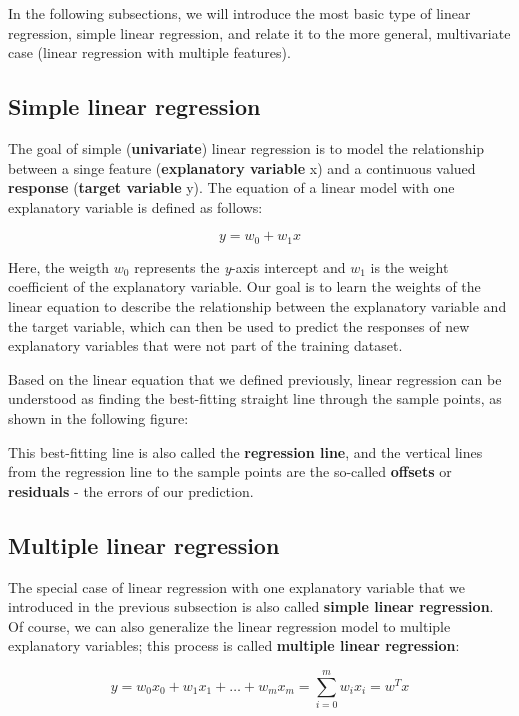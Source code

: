 \documentclass[11pt]{article}
\begin{document}
In the following subsections, we will introduce the most basic type of
linear regression, simple linear regression, and relate it to the more
general, multivariate case (linear regression with multiple features).

    \subsection{Simple linear regression}\label{simple-linear-regression}

    The goal of simple (\textbf{univariate}) linear regression is to model
the relationship between a singe feature (\textbf{explanatory variable}
x) and a continuous valued \textbf{response} (\textbf{target variable}
y). The equation of a linear model with one explanatory variable is
defined as follows:

\[y = w_0 + w_1x\]

Here, the weigth \(w_0\) represents the \emph{y}-axis intercept and
\(w_1\) is the weight coefficient of the explanatory variable. Our goal
is to learn the weights of the linear equation to describe the
relationship between the explanatory variable and the target variable,
which can then be used to predict the responses of new explanatory
variables that were not part of the training dataset.

Based on the linear equation that we defined previously, linear
regression can be understood as finding the best-fitting straight line
through the sample points, as shown in the following figure:

This best-fitting line is also called the \textbf{regression line}, and
the vertical lines from the regression line to the sample points are the
so-called \textbf{offsets} or \textbf{residuals} - the errors of our
prediction.

    \subsection{Multiple linear
regression}\label{multiple-linear-regression}

    The special case of linear regression with one explanatory variable that
we introduced in the previous subsection is also called \textbf{simple
linear regression}. Of course, we can also generalize the linear
regression model to multiple explanatory variables; this process is
called \textbf{multiple linear regression}:

\[y = w_0x_0 + w_1x_1 + \ldots + w_mx_m = \sum_{i=0}^m w_ix_i = w^Tx\]
\end{document}
